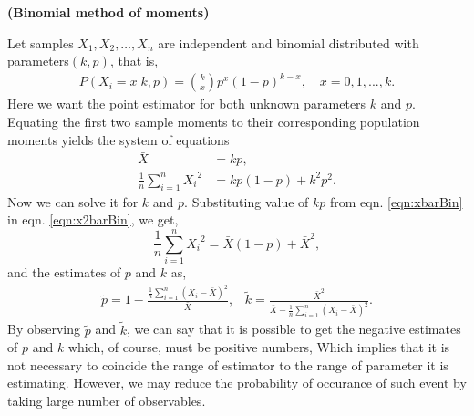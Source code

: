 \documentclass[a4paper,english,12pt]{article}
\begin{document}
\begin{exmp}\textbf{(Binomial method of moments)}
\par Let samples $X_1,X_2,\dots,X_n$ are independent and binomial distributed with parameters$(k,p)$, that is,
\begin{align}
P(X_i=x|k,p) = {{k}\choose{x}}p^x(1-p)^{k-x},\,\,\,\,\,\,x=0,1,...,k.
\end{align} 
Here we want the point estimator for both unknown parameters $k$ and $p$.
Equating the first two sample moments to their corresponding population moments yields the system of equations
\begin{align}\label{eqn:xbarBin}
\bar{X} &= kp,\\\label{eqn:x2barBin}
\frac{1}{n}\sum_{i=1}^n{X_i}^2 &= kp(1-p) + k^2p^2.
\end{align} 
Now we can solve it  for $k$ and $p$. Substituting value of $kp$ from eqn. \eqref{eqn:xbarBin} in eqn. \eqref{eqn:x2barBin}, we get,
\begin{equation}
\frac{1}{n}\sum_{i=1}^n{X_i}^2 = \bar{X}(1-p) + \bar{X}^2,
\end{equation}
and the estimates of $p$ and $k$ as,
\begin{align}
\tilde{p}=1-\frac{\frac{1}{n}\sum_{i=1}^n{(X_i - \bar{X})}^2}{\bar{X}} ,     \,\,\,\,\,\tilde{k} = \frac{\bar{X}^2}{\bar{X}-\frac{1}{n}\sum_{i=1}^n{(X_i - \bar{X})}^2}.
\end{align} 
By observing $\tilde{p}$ and $\tilde{k}$, we can say that it is possible to get the negative estimates of $p$ and $k$ which, of course, must be positive numbers, Which implies that it is not necessary to coincide the range of estimator to the range of parameter it is estimating. However, we may reduce the probability of occurance of such event by taking large number of observables.   
\end{exmp}
\end{document}
